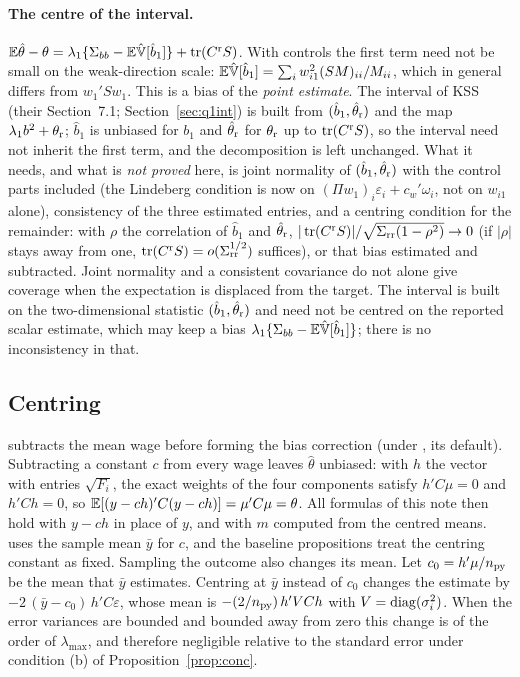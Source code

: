 \paragraph{The centre of the interval.} $\mathbb{E}\hat\theta-\theta=\lambda_1\{\Sigma_{bb}-\mathbb{E}\hat{\mathbb{V}}[\hat b_1]\}+\operatorname{tr}(C^{\rm r}S)$.
With controls the first term need not be small on the weak-direction scale:
$\mathbb{E}\hat{\mathbb{V}}[\hat b_1]=\sum_iw_{i1}^2(SM)_{ii}/M_{ii}$, which in general differs from $w_1'Sw_1$. This is a bias of the
\emph{point estimate}. The interval of KSS (their Section~7.1; Section~\ref{sec:q1int}) is built from
$(\hat b_1,\hat\theta_{\rm r})$ and the map $\lambda_1b^2+\theta_{\rm r}$; $\hat b_1$ is unbiased for $b_1$ and
$\hat\theta_{\rm r}$ for $\theta_{\rm r}$ up to $\operatorname{tr}(C^{\rm r}S)$, so the interval need not inherit the first term, and
the decomposition is left unchanged. What it needs, and what is \emph{not proved} here, is joint normality of
$(\hat b_1,\hat\theta_{\rm r})$ with the control parts included (the Lindeberg condition is now on
$(\Pi w_1)_i\varepsilon_i+c_w'\omega_i$, not on $w_{i1}$ alone), consistency of the three estimated entries, and a
centring condition for the remainder: with $\rho$ the correlation of $\hat b_1$ and $\hat\theta_{\rm r}$,
$|\operatorname{tr}(C^{\rm r}S)|/\sqrt{\Sigma_{\rm rr}(1-\rho^2)}\to0$ (if $|\rho|$ stays away from one,
$\operatorname{tr}(C^{\rm r}S)=o(\Sigma_{\rm rr}^{1/2})$ suffices), or that bias estimated and subtracted. Joint normality and a
consistent covariance do not alone give coverage when the expectation is displaced from the target. The interval
is built on the two-dimensional statistic $(\hat b_1,\hat\theta_{\rm r})$ and need not be centred on the reported
scalar estimate, which may keep a bias $\lambda_1\{\Sigma_{bb}-\mathbb{E}\hat{\mathbb{V}}[\hat b_1]\}$; there is no inconsistency in that.

\subsection{Centring}\label{sec:centring}

\fevc{} subtracts the mean wage before forming the bias correction (under , its default).
Subtracting a constant $c$ from every wage leaves $\hat\theta$ unbiased: with $h$ the vector with entries
$\sqrt{F_i}$, the exact weights of the four components satisfy $h'C\mu=0$ and $h'Ch=0$, so
$\mathbb{E}[(y-ch)'C(y-ch)]=\mu'C\mu=\theta$. All formulas of this note then hold with $y-ch$ in place of $y$, and with $m$
computed from the centred means. \fevc{} uses the sample mean $\bar y$ for $c$, and the baseline propositions treat the centring constant as fixed. Sampling the outcome also changes its mean. Let $c_0=h'\mu/n_{\rm py}$
be the mean that $\bar y$ estimates. Centring at $\bar y$ instead of $c_0$ changes the estimate by
$-2\,(\bar y-c_0)\,h'C\varepsilon$, whose mean is $-(2/n_{\rm py})\,h'VCh$ with $V=\operatorname{diag}(\sigma_i^2)$. When
the error variances are bounded and bounded away from zero this change is of the order of $\lambda_{\max}$, and
therefore negligible relative to the standard error under condition (b) of Proposition~\ref{prop:conc}.

